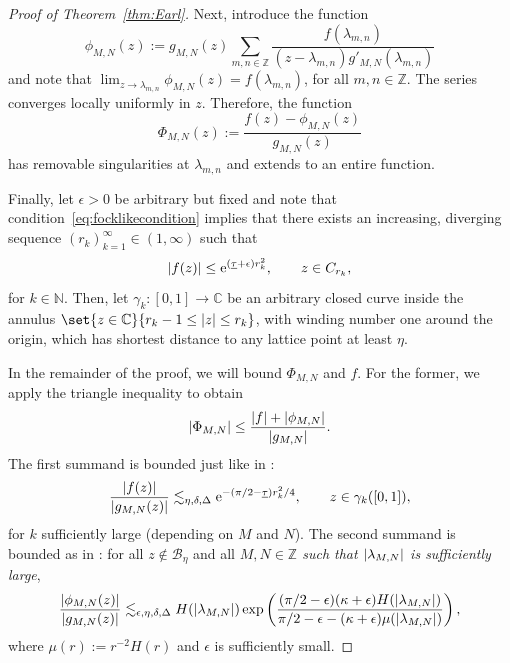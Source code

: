 \documentclass{article}
\newcommand{\bbC}{\mathbb{C}}
\newcommand{\bbN}{\mathbb{N}}
\newcommand{\bbZ}{\mathbb{Z}}
\newcommand{\calB}{\mathcal{B}}
\newcommand{\rme}{\mathrm{e}}
\DeclarePairedDelimiter{\abs}{\lvert}{\rvert}
\theoremstyle{remark}
\begin{document}
\begin{proof}[Proof of Theorem~\ref{thm:Earl}]
        Next, introduce the function
        \begin{equation*}
            \phi_{M,N}(z) := g_{M,N}(z) \sum_{m,n \in \bbZ} \frac{f(\lambda_{m,n})}{(z-\lambda_{m,n}) g'_{M,N}(\lambda_{m,n})}
        \end{equation*}
        and note that $\lim_{z \to \lambda_{m,n}} \phi_{M,N}(z) = f(\lambda_{m,n})$, for all $m,n \in \bbZ$. The series converges locally uniformly in $z$. Therefore, the function 
        \begin{equation*}
            \Phi_{M,N}(z) := \frac{f(z) - \phi_{M,N}(z)}{g_{M,N}(z)}
        \end{equation*}
        has removable singularities at $\lambda_{m,n}$ and extends to an entire function.

        Finally, let $\epsilon > 0$ be arbitrary but fixed and note that condition~\eqref{eq:focklikecondition} implies that there exists an increasing, diverging sequence $(r_k)_{k = 1}^\infty \in (1,\infty)$ such that
        \begin{equation*}
            \abs{f(z)} \leq \rme^{(\underline \tau+\epsilon) r_k^2}, \qquad z \in C_{r_k},
        \end{equation*}
        for $k \in \bbN$. Then, let $\gamma_k : [0,1] \to \bbC$ be an arbitrary closed curve inside the annulus $\set{z \in \bbC}{r_k - 1 \leq \abs{z} \leq r_k}$, with winding number one around the origin, which has shortest distance to any lattice point at least $\eta$.

        In the remainder of the proof, we will bound $\Phi_{M,N}$ and $f$. For the former, we apply the triangle inequality to obtain 
        \begin{equation*}
            \abs{\Phi_{M,N}} \leq \frac{\abs{f} + \abs{\phi_{M,N}}}{\abs{g_{M,N}}}.
        \end{equation*}
        The first summand is bounded just like in \cite[equations~(5.5)--(5.7) on p.~732]{Earl1966On}: %
        \begin{equation*}
            \frac{\abs{f(z)}}{\abs{g_{M,N}(z)}} \lesssim_{\eta,\delta,\Delta} \rme^{-(\pi/2 - \underline \tau) r_k^2 / 4}, \qquad z \in \gamma_k([0,1]),
        \end{equation*}
        for $k$ sufficiently large (depending on $M$ and $N$).
        The second summand is bounded as in \cite[equations~(5.11)--(5.20) on pp.~733--734]{Earl1966On}: for all $z \not\in \calB_\eta$ and all \emph{$M,N \in \bbZ$ such that $\abs{\lambda_{M,N}}$ is sufficiently large}, %
        \begin{equation}\label{eq:secondsummand}
            \frac{\abs{\phi_{M,N}(z)}}{\abs{g_{M,N}(z)}} \lesssim_{\epsilon,\eta,\delta,\Delta} H(\abs{\lambda_{M,N}}) \exp\left( \frac{(\pi/2-\epsilon)(\kappa+\epsilon)H(\abs{\lambda_{M,N}})}{\pi/2 - \epsilon - (\kappa+\epsilon)\mu(\abs{\lambda_{M,N}})} \right),
        \end{equation}
        where $\mu(r) := r^{-2} H(r)$ and $\epsilon$ is sufficiently small.
        

\end{proof}
\end{document}
